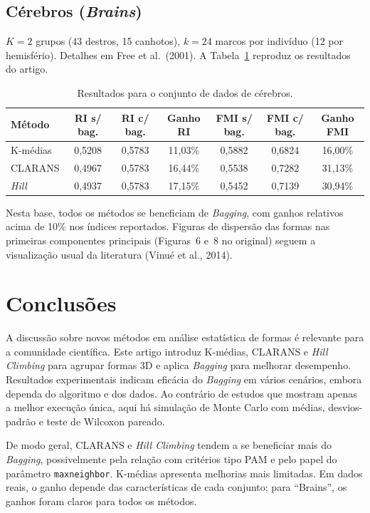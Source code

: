 \documentclass[11pt,a4paper]{article}
\begin{document}
\subsection{Cérebros (\emph{Brains})}

$K=2$ grupos (43 destros, 15 canhotos), $k=24$ marcos por indivíduo (12 por hemisfério). Detalhes em Free et al.\ (2001). A Tabela~\ref{tab:cerebros} reproduz os resultados do artigo.

\begin{table}[ht]\centering
\caption{Resultados para o conjunto de dados de cérebros.}
\label{tab:cerebros}
\begin{tabular}{lcccccc}
\toprule
Método & RI s/ bag. & RI c/ bag. & Ganho RI & FMI s/ bag. & FMI c/ bag. & Ganho FMI \\
\midrule
K-médias      & 0{,}5208 & 0{,}5783 & 11{,}03\% & 0{,}5882 & 0{,}6824 & 16{,}00\% \\
CLARANS       & 0{,}4967 & 0{,}5783 & 16{,}44\% & 0{,}5538 & 0{,}7282 & 31{,}13\% \\
\emph{Hill}   & 0{,}4937 & 0{,}5783 & 17{,}15\% & 0{,}5452 & 0{,}7139 & 30{,}94\% \\
\bottomrule
\end{tabular}
\end{table}

Nesta base, todos os métodos se beneficiam de \emph{Bagging}, com ganhos relativos acima de 10\% nos índices reportados. Figuras de dispersão das formas nas primeiras componentes principais (Figuras~6 e~8 no original) seguem a visualização usual da literatura (Vinué et al., 2014).

\section{Conclusões}\label{sec:conclusoes}

A discussão sobre novos métodos em análise estatística de formas é relevante para a comunidade científica. Este artigo introduz K-médias, CLARANS e \emph{Hill Climbing} para agrupar formas 3D e aplica \emph{Bagging} para melhorar desempenho. Resultados experimentais indicam eficácia do \emph{Bagging} em vários cenários, embora dependa do algoritmo e dos dados. Ao contrário de estudos que mostram apenas a melhor execução única, aqui há simulação de Monte Carlo com médias, desvios-padrão e teste de Wilcoxon pareado.

De modo geral, CLARANS e \emph{Hill Climbing} tendem a se beneficiar mais do \emph{Bagging}, possivelmente pela relação com critérios tipo PAM e pelo papel do parâmetro \texttt{maxneighbor}. K-médias apresenta melhorias mais limitadas. Em dados reais, o ganho depende das características de cada conjunto; para ``Brains'', os ganhos foram claros para todos os métodos.
\end{document}
